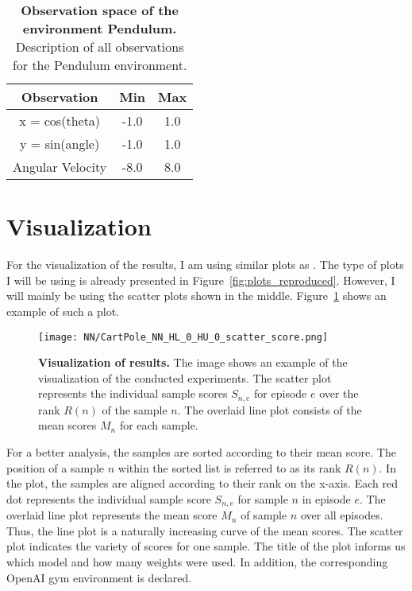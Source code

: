 \begin{table}[!ht]
  \centering
  \begin{tabular}{ |c|c|c| }
    \hline
    Observation & Min & Max \\
    \hline
    x = cos(theta) & -1.0 & 1.0 \\
    y = sin(angle) & -1.0 & 1.0 \\
    Angular Velocity & -8.0 & 8.0 \\
    \hline
  \end{tabular}
  \caption[Observation space of the environment Pendulum]{
    \textbf{Observation space of the environment Pendulum.}
    Description of all observations for the Pendulum environment.
  }
  \label{table:pendulum_obs}
\end{table}


\section{Visualization}
For the visualization of the results, I am using similar plots as \cite{oller_analyzing_2020}. The type of plots I will be using is already presented in Figure~\ref{fig:plots_reproduced}. However, I will mainly be using the scatter plots shown in the middle. Figure~\ref{fig:visualization} shows an example of such a plot.
\begin{figure}[!ht]
  \centering
\texttt{[image: NN/CartPole\_NN\_HL\_0\_HU\_0\_scatter\_score.png]}
\caption[Visualization of results]{
  \textbf{Visualization of results.}
  The image shows an example of the visualization of the conducted experiments. The scatter plot represents the individual sample scores $S_{n,e}$ for episode $e$ over the rank $R(n)$ of the sample $n$. The overlaid line plot consists of the mean scores $M_n$ for each sample.
}
\label{fig:visualization}
\end{figure}
For a better analysis, the samples are sorted according to their mean score. The position of a sample $n$ within the sorted list is referred to as its rank $R(n)$. In the plot, the samples are aligned according to their rank on the x-axis. Each red dot represents the individual sample score $S_{n,e}$ for sample $n$ in episode $e$. The overlaid line plot represents the mean score $M_n$ of sample $n$ over all episodes. Thus, the line plot is a naturally increasing curve of the mean scores. The scatter plot indicates the variety of scores for one sample. The title of the plot informs us which model and how many weights were used. In addition, the corresponding OpenAI gym environment is declared.


